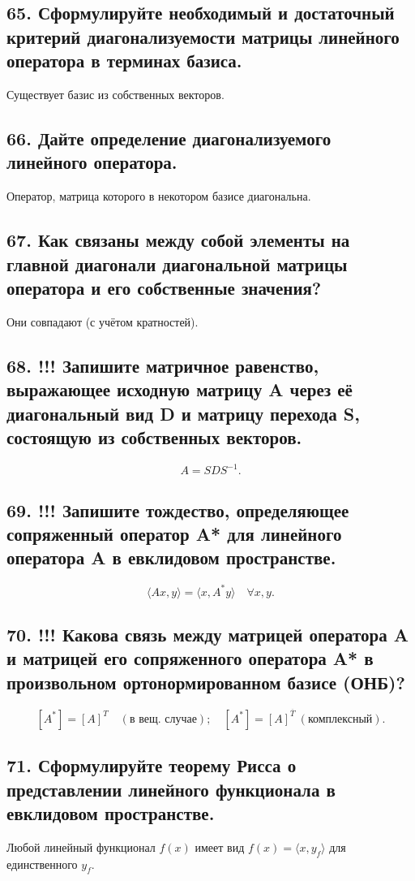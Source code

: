\documentclass[a4paper,12pt]{article}
\begin{document}
\subsection*{65. Сформулируйте необходимый и достаточный критерий диагонализуемости матрицы линейного оператора в терминах базиса.}
Существует базис из собственных векторов.

\subsection*{66. Дайте определение диагонализуемого линейного оператора.}
Оператор, матрица которого в некотором базисе диагональна.

\subsection*{67. Как связаны между собой элементы на главной диагонали диагональной матрицы оператора и его собственные значения?}
Они совпадают (с учётом кратностей).

\subsection*{68. !!! Запишите матричное равенство, выражающее исходную матрицу A через её диагональный вид D и матрицу перехода S, состоящую из собственных векторов.}
\[ A = S D S^{-1}. \]

\subsection*{69. !!! Запишите тождество, определяющее сопряженный оператор A* для линейного оператора A в евклидовом пространстве.}
\[ \langle A x, y \rangle = \langle x, A^* y \rangle \quad \forall x, y. \]

\subsection*{70. !!! Какова связь между матрицей оператора A и матрицей его сопряженного оператора A* в произвольном ортонормированном базисе (ОНБ)?}
\[ [A^*] = [A]^T \quad (\text{в вещ. случае}); \quad [A^*] = [A]^{\overline{T}} \ (\text{комплексный}). \]

\subsection*{71. Сформулируйте теорему Рисса о представлении линейного функционала в евклидовом пространстве.}
Любой линейный функционал \(f(x)\) имеет вид \(f(x) = \langle x, y_f \rangle\) для единственного \(y_f\).
\end{document}
